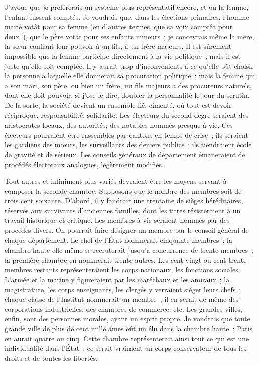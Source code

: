 \documentclass[french,twoside]{book} %
\begin{document}
J’avoue que je préférerais un système plus représentatif encore, et où la femme, l’enfant fussent comptés. Je voudrais que, dans les élections primaires, l’homme marié votât pour sa femme (en d’autres termes, que sa voix comptât pour deux ), que le père votât pour ses enfants mineurs ; je concevrais même la mère, la sœur confiant leur pouvoir à un fils, à un frère majeurs. Il est sûrement impossible que la femme participe directement à la vie politique ; mais il est juste qu’elle soit comptée. Il y aurait trop d’inconvénients à ce qu’elle pût choisir la personne à laquelle elle donnerait sa procuration politique ; mais la femme qui a son mari, son père, ou bien un frère, un fils majeurs a des procureurs naturels, dont elle doit pouvoir, si j’ose le dire, doubler la personnalité le jour du scrutin. De la sorte, la société devient un ensemble lié, cimenté, où tout est devoir réciproque, responsabilité, solidarité. Les électeurs du second degré seraient des aristocrates locaux, des autorités, des notables nommés presque à vie. Ces électeurs pourraient être rassemblés par cantons en temps de crise ; ils seraient les gardiens des mœurs, les surveillants des deniers publics ; ils tiendraient école de gravité et de sérieux. Les conseils généraux de département émaneraient de procédés électoraux analogues, légèrement modifiés.\par
Tout autres et infiniment plus variés devraient être les moyens servant à composer la seconde chambre. Supposons que le nombre des membres soit de trois cent soixante. D’abord, il y faudrait une trentaine de sièges héréditaires, réservés aux survivants d’anciennes familles, dont les titres résisteraient à un travail historique et critique. Les membres à vie seraient nommés par des procédés divers. On pourrait faire désigner un membre par le conseil général de chaque département. Le chef de l’État nommerait cinquante membres ; la chambre haute elle-même se recruterait jusqu’à concurrence de trente membres ; la première chambre en nommerait trente autres. Les cent vingt ou cent trente membres restants représenteraient les corps nationaux, les fonctions sociales. L’armée et la marine y figureraient par les maréchaux et les amiraux ; la magistrature, les corps enseignants, les clergés y verraient siéger leurs chefs ; chaque classe de l’Institut nommerait un membre ; il en serait de même des corporations industrielles, des chambres de commerce, etc. Les grandes villes, enfin, sont des personnes morales, ayant un esprit propre. Je voudrais que toute grande ville de plus de cent mille âmes eût un élu dans la chambre haute ; Paris en aurait quatre ou cinq. Cette chambre représenterait ainsi tout ce qui est une individualité dans l’État ; ce serait vraiment un corps conservateur de tous les droits et de toutes les libertés.\par
\end{document}

